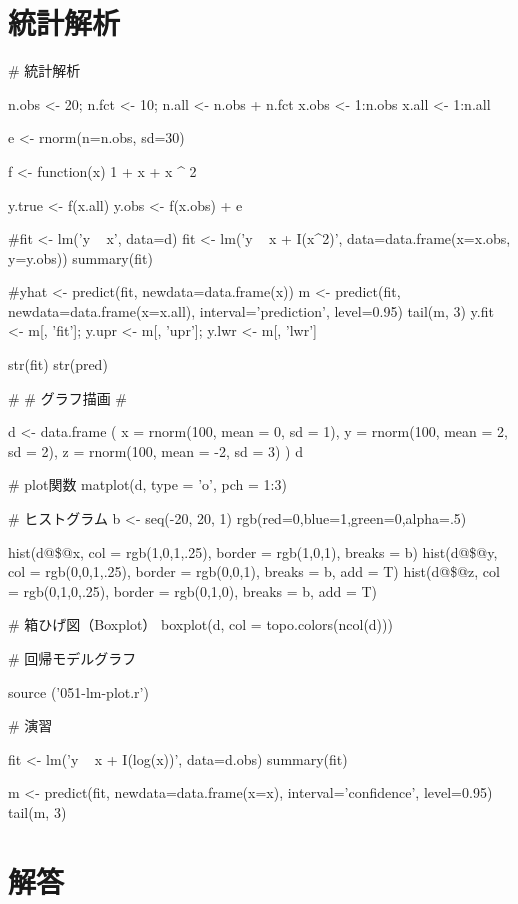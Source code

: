 \documentclass[../main]{subfiles}
\begin{document}
\tcbstartrecording\relax

\section{統計解析}

\begin{ConsoleR}
# 統計解析

n.obs <- 20; n.fct <- 10; n.all <- n.obs + n.fct
x.obs <- 1:n.obs 
x.all <- 1:n.all

e <- rnorm(n=n.obs, sd=30)

f <- function(x) 1 + x + x ^ 2 

y.true <- f(x.all)
y.obs  <- f(x.obs) + e

#fit <- lm('y ~ x', data=d)
fit <- lm('y ~ x + I(x^2)', data=data.frame(x=x.obs, y=y.obs))
summary(fit)

#yhat <- predict(fit, newdata=data.frame(x))
m <- predict(fit, newdata=data.frame(x=x.all), interval='prediction', level=0.95)
tail(m, 3)
y.fit <- m[, 'fit']; y.upr <- m[, 'upr']; y.lwr <- m[, 'lwr'] 

str(fit)
str(pred)

#
# グラフ描画
#

d <- data.frame (
  x = rnorm(100, mean =  0, sd = 1),
  y = rnorm(100, mean =  2, sd = 2),
  z = rnorm(100, mean = -2, sd = 3)
) 
d

# plot関数
matplot(d, type = 'o', pch = 1:3)

# ヒストグラム
b <- seq(-20, 20, 1)
rgb(red=0,blue=1,green=0,alpha=.5)

hist(d@\$@x, col    = rgb(1,0,1,.25),
             border = rgb(1,0,1),
             breaks = b)
hist(d@\$@y, col    = rgb(0,0,1,.25),
             border = rgb(0,0,1),
             breaks = b, add = T)
hist(d@\$@z, col    = rgb(0,1,0,.25),
             border = rgb(0,1,0),
             breaks = b, add = T)

# 箱ひげ図（Boxplot）
boxplot(d, col = topo.colors(ncol(d)))

# 回帰モデルグラフ

source ('051-lm-plot.r')

# 演習

fit <- lm('y ~ x + I(log(x))', data=d.obs)
summary(fit)

m <- predict(fit, newdata=data.frame(x=x), interval='confidence', level=0.95)
tail(m, 3)

\end{ConsoleR}

\tcbstoprecording
\section{解答}
\tcbinputrecords
\end{document}
